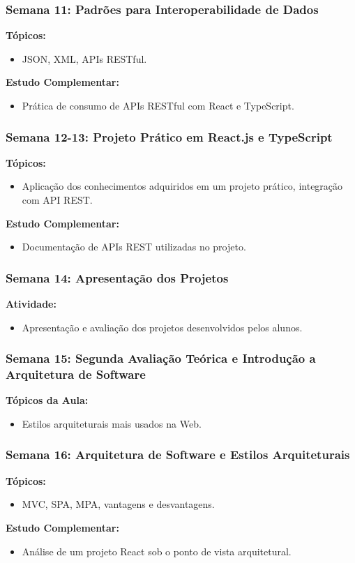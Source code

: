 \begin{frame}[fragile]
  \frametitle{Semana 11: Padrões para Interoperabilidade de Dados}
  \textbf{Tópicos:}
  \begin{itemize}
    \item JSON, XML, APIs RESTful.
  \end{itemize}
  \textbf{Estudo Complementar:}
  \begin{itemize}
    \item Prática de consumo de APIs RESTful com React e TypeScript.
  \end{itemize}
\end{frame}


\begin{frame}[fragile]
  \frametitle{Semana 12-13: Projeto Prático em React.js e TypeScript}
  \textbf{Tópicos:}
  \begin{itemize}
    \item Aplicação dos conhecimentos adquiridos em um projeto prático, integração com API REST.
  \end{itemize}
  \textbf{Estudo Complementar:}
  \begin{itemize}
    \item Documentação de APIs REST utilizadas no projeto.
  \end{itemize}
\end{frame}

\begin{frame}[fragile]
  \frametitle{Semana 14: Apresentação dos Projetos}
  \textbf{Atividade:}
  \begin{itemize}
    \item Apresentação e avaliação dos projetos desenvolvidos pelos alunos.
  \end{itemize}
\end{frame}

\begin{frame}[fragile]
  \frametitle{Semana 15: Segunda Avaliação Teórica e Introdução a Arquitetura de Software}
  \textbf{Tópicos da Aula:}
  \begin{itemize}
    \item Estilos arquiteturais mais usados na Web.
  \end{itemize}
\end{frame}

\begin{frame}[fragile]
  \frametitle{Semana 16: Arquitetura de Software e Estilos Arquiteturais}
  \textbf{Tópicos:}
  \begin{itemize}
    \item MVC, SPA, MPA, vantagens e desvantagens.
  \end{itemize}
  \textbf{Estudo Complementar:}
  \begin{itemize}
    \item Análise de um projeto React sob o ponto de vista arquitetural.
  \end{itemize}
\end{frame}

